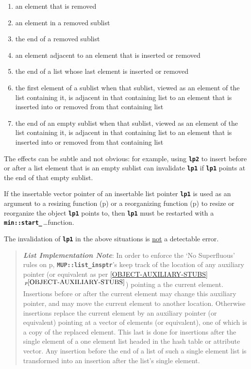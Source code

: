\documentclass[12pt]{article}
\newcommand{\TT}[1]{{\tt \bfseries #1}}
\newcommand{\key}[1]{{\bf \em #1}\index{#1}}
\newcommand{\itemref}[1]{\ref{#1}$\,^{p\pageref{#1}}$}
\newcommand{\pagref}[1]{p\pageref{#1}}
\newcommand{\EOL}{\penalty \exhyphenpenalty}
\begin{document}
\begin{enumerate}
\item an element that is removed
\item an element in a removed sublist
\item the end of a removed sublist
\item an element adjacent to an element that is inserted or removed
\item the end of a list whose last element is inserted or removed
\item the first element of a sublist
      when that sublist, viewed as an element of the list containing
      it, is adjacent in that containing list to
      an element that is inserted into or removed from that containing list
\item the end of an empty sublist
      when that sublist, viewed as an element of the list containing
      it, is adjacent in that containing list to
      an element that is inserted into or removed from that containing list
\end{enumerate}

The effects can be subtle
and not obvious: for example, using \TT{lp2} to insert before or after
a list element that is an empty sublist can invalidate \TT{lp1}
if \TT{lp1} points at the end of that empty sublist.

If the insertable vector pointer of an insertable list pointer
\TT{lp1} is used as an argument to
a resizing function (\pagref{RESIZING-FUNCTIONS}) or
a reorganizing function (\pagref{REORGANIZING-FUNCTIONS}) to resize
or reorganize the object \TT{lp1} points to, then
\TT{lp1} must be restarted with a
\TT{min::\EOL start\_}\,\ldots function.

The invalidation of \TT{lp1} in the above situations
is \underline{not} a detectable error.

\begin{quote}
\key{List Implementation Note}:\label{LIST-IMPLEMENTATION-NOTE}
In order to enforce the `No Superfluous' rules on 
\pagref{NO-SUPERFLUOUS-LIST}, \TT{MUP::list\_insptr}'s keep
track of the location of any auxiliary pointer
(or equivalent as per \itemref{OBJECT-AUXILIARY-STUBS})
pointing a the current
element.  Insertions before or after the current element may change
this auxiliary pointer, and may move the current element to another
location.  Otherwise insertions replace the current element
by an auxiliary pointer (or equivalent)
pointing at a vector of elements (or equivalent),
one of which is a copy of the replaced element.
This last is done for insertions after the single element of a one
element list headed in the hash table or attribute vector.
Any insertion before the end of a list of such a single element list
is transformed into an insertion after the list's single element.
\end{quote}
\end{document}
